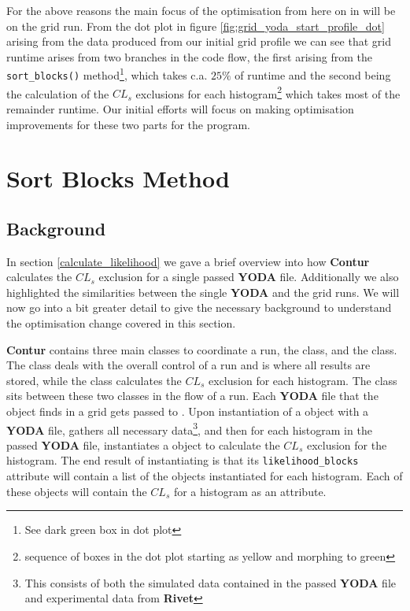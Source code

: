 For the above reasons the main focus of the optimisation from here on in will be on the grid run. From the dot plot in figure \ref{fig:grid_yoda_start_profile_dot} arising from the data produced from our initial grid profile we can see that grid runtime arises from two branches in the code flow, the first arising from the \texttt{sort\_blocks()} method\footnote{See dark green box in dot plot}, which takes c.a. $25\%$ of runtime and the second being the calculation of the $CL_s$ exclusions for each histogram\footnote{sequence of boxes in the dot plot starting as yellow and morphing to green} which takes most of the remainder runtime. Our initial efforts will focus on making optimisation improvements for these two parts for the program.

\section{Sort Blocks Method}\label{sortBlocksSection}

\subsection{Background}
In section \ref{calculate_likelihood} we gave a brief overview into how \textbf{Contur} calculates the $CL_s$ exclusion for a single passed \textbf{YODA} file. Additionally we also  highlighted the similarities between the single \textbf{YODA} and the grid runs. We will now go into a bit greater detail to give the necessary background to understand the optimisation change covered in this section.

\textbf{Contur} contains three main classes to coordinate a run, the  class,  and the   class. The  class deals with the overall control of a run and is where all results are stored, while the  class calculates the $CL_s$ exclusion for each histogram. The  class sits between these two classes in the flow of a run. Each \textbf{YODA} file that the  object finds in a grid gets passed to . Upon instantiation of a  object with a  \textbf{YODA} file,  gathers all necessary data\footnote{This consists of both the simulated data contained in the passed \textbf{YODA} file and experimental data from \textbf{Rivet}}, and then for each histogram in the passed  \textbf{YODA} file,  instantiates a  object to calculate the $CL_s$ exclusion for the histogram. The end result of instantiating  is that its \texttt{likelihood\_blocks} attribute will contain a list of the  objects instantiated for each histogram. Each of these  objects will contain the $CL_s$ for a histogram as an attribute.

